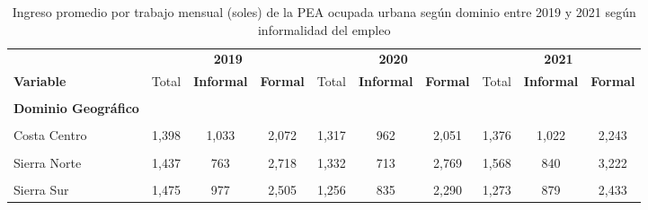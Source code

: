 \documentclass[
  letterpaper,
  12pt,
  oneside,
  spanish,
  doublespacing,
  headsepline,
  parskip]{MastersDoctoralThesis}
\begin{document}
\hypertarget{tbl-ing_dominio}{}
\begin{table}[H]
\caption{\label{tbl-ing_dominio}Ingreso promedio por trabajo mensual (soles) de la PEA ocupada urbana
según dominio entre 2019 y 2021 según informalidad del empleo }\tabularnewline

\centering\begingroup\fontsize{9}{11}\selectfont

\begin{tabular}{lccccccccc}
\toprule
\multicolumn{1}{c}{ } & \multicolumn{3}{c}{\textbf{2019}} & \multicolumn{3}{c}{\textbf{2020}} & \multicolumn{3}{c}{\textbf{2021}} \\
\cmidrule(l{3pt}r{3pt}){2-4} \cmidrule(l{3pt}r{3pt}){5-7} \cmidrule(l{3pt}r{3pt}){8-10}
\textbf{Variable} & Total & \textbf{Informal} & \textbf{Formal} & Total & \textbf{Informal} & \textbf{Formal} & Total & \textbf{Informal} & \textbf{Formal}\\
\midrule
\cellcolor{gray!6}{\textbf{Nacional}} & \cellcolor{gray!6}{1,595} & \cellcolor{gray!6}{1,037} & \cellcolor{gray!6}{2,599} & \cellcolor{gray!6}{1,407} & \cellcolor{gray!6}{901} & \cellcolor{gray!6}{2,380} & \cellcolor{gray!6}{1,443} & \cellcolor{gray!6}{989} & \cellcolor{gray!6}{2,473}\\
\textbf{Dominio Geográfico} &  &  &  &  &  &  &  &  & \\
\cellcolor{gray!6}{Costa Norte} & \cellcolor{gray!6}{1,302} & \cellcolor{gray!6}{941} & \cellcolor{gray!6}{2,198} & \cellcolor{gray!6}{1,167} & \cellcolor{gray!6}{811} & \cellcolor{gray!6}{2,035} & \cellcolor{gray!6}{1,303} & \cellcolor{gray!6}{947} & \cellcolor{gray!6}{2,273}\\
Costa Centro & 1,398 & 1,033 & 2,072 & 1,317 & 962 & 2,051 & 1,376 & 1,022 & 2,243\\
\cellcolor{gray!6}{Costa Sur} & \cellcolor{gray!6}{1,560} & \cellcolor{gray!6}{1,071} & \cellcolor{gray!6}{2,518} & \cellcolor{gray!6}{1,390} & \cellcolor{gray!6}{918} & \cellcolor{gray!6}{2,317} & \cellcolor{gray!6}{1,401} & \cellcolor{gray!6}{1,008} & \cellcolor{gray!6}{2,397}\\
\addlinespace
Sierra Norte & 1,437 & 763 & 2,718 & 1,332 & 713 & 2,769 & 1,568 & 840 & 3,222\\
\cellcolor{gray!6}{Sierra Centro} & \cellcolor{gray!6}{1,339} & \cellcolor{gray!6}{845} & \cellcolor{gray!6}{2,454} & \cellcolor{gray!6}{1,276} & \cellcolor{gray!6}{706} & \cellcolor{gray!6}{2,694} & \cellcolor{gray!6}{1,209} & \cellcolor{gray!6}{804} & \cellcolor{gray!6}{2,588}\\
Sierra Sur & 1,475 & 977 & 2,505 & 1,256 & 835 & 2,290 & 1,273 & 879 & 2,433\\

\end{tabular}
\end{table}
\end{document}
